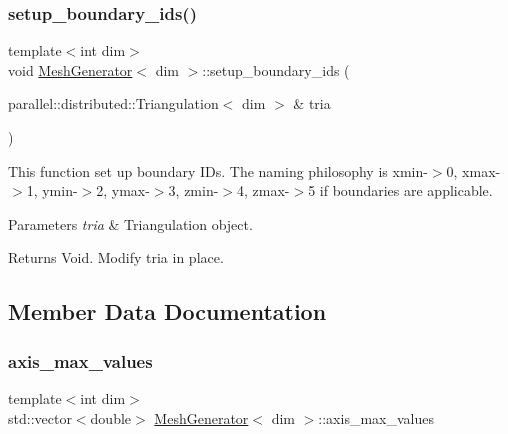 \mbox{\label{class_mesh_generator_a661d4e5efeb3ee94cc70c5da8e94a0ee}} 
\subsubsection{\texorpdfstring{setup\+\_\+boundary\+\_\+ids()}{setup\_boundary\_ids()}}
{\footnotesize\ttfamily template$<$int dim$>$ \\
void \hyperlink{class_mesh_generator}{Mesh\+Generator}$<$ dim $>$\+::setup\+\_\+boundary\+\_\+ids (\begin{DoxyParamCaption}\item[{parallel\+::distributed\+::\+Triangulation$<$ dim $>$ \&}]{tria }\end{DoxyParamCaption})\hspace{0.3cm}{\ttfamily [private]}}

This function set up boundary I\+Ds. The naming philosophy is xmin-\/$>$0, xmax-\/$>$1, ymin-\/$>$2, ymax-\/$>$3, zmin-\/$>$4, zmax-\/$>$5 if boundaries are applicable.


\begin{DoxyParams}{Parameters}
{\em tria} & Triangulation object. \\
\hline
\end{DoxyParams}
\begin{DoxyReturn}{Returns}
Void. Modify tria in place. 
\end{DoxyReturn}


\subsection{Member Data Documentation}
\mbox{\label{class_mesh_generator_ab65cdce3616c05ca7b02f88a63c7a403}} 
\subsubsection{\texorpdfstring{axis\+\_\+max\+\_\+values}{axis\_max\_values}}
{\footnotesize\ttfamily template$<$int dim$>$ \\
std\+::vector$<$double$>$ \hyperlink{class_mesh_generator}{Mesh\+Generator}$<$ dim $>$\+::axis\+\_\+max\+\_\+values\hspace{0.3cm}{\ttfamily [private]}}



